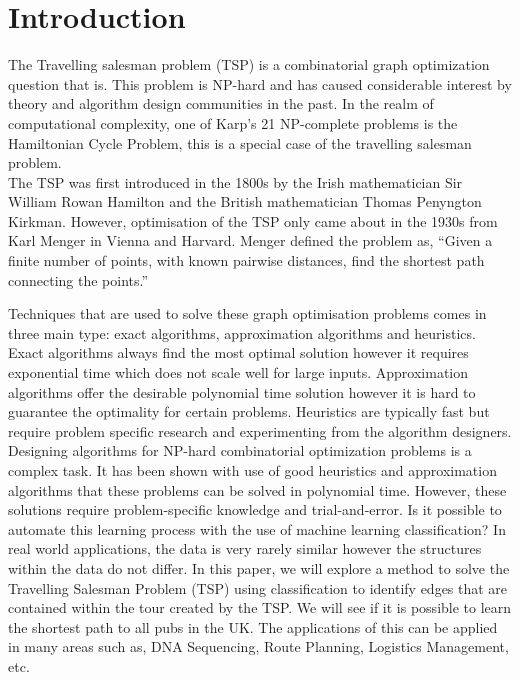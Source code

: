 \documentclass[]{UCD_CS_FYP_Report}
\begin{document}
\chapter{Introduction}
The Travelling salesman problem (TSP) is a combinatorial graph optimization question that is. This problem is NP-hard and has caused considerable interest by theory and algorithm design communities in the past. In the realm of computational complexity, one of Karp's 21 NP-complete problems is the Hamiltonian Cycle Problem, this is a special case of the travelling salesman problem.\\[0.2cm] 
The TSP was first introduced in the 1800s by the Irish mathematician Sir William Rowan Hamilton and the British mathematician Thomas Penyngton Kirkman. However, optimisation of the TSP only came about in the 1930s from Karl Menger in Vienna and Harvard. Menger defined the problem as, “Given a finite number of points, with known pairwise distances, find the shortest path connecting the points.”\cite{Menger}

Techniques that are used to solve these graph optimisation problems comes in three main type: exact algorithms, approximation algorithms and heuristics. Exact algorithms always find the most optimal solution however it requires exponential time which does not scale well for large inputs. Approximation algorithms offer the desirable polynomial time solution however it is hard to guarantee the optimality for certain problems. Heuristics are typically fast but require problem specific research and experimenting from the algorithm designers.\\[0.2cm]
Designing algorithms for NP-hard combinatorial optimization problems is a complex task. It has been shown with use of good heuristics and approximation algorithms that these problems can be solved in polynomial time. However, these solutions require problem-specific knowledge and trial-and-error. Is it possible to automate this learning process with the use of machine learning classification? In real world applications, the data is very rarely similar however the structures within the data do not differ. In this paper, we will explore a method to solve the Travelling Salesman Problem (TSP) using classification to identify edges that are contained within the tour created by the TSP. We will see if it is possible to learn the shortest path to all pubs in the UK. The applications of this can be applied in many areas such as, DNA Sequencing, Route Planning, Logistics Management, etc.

\end{document}
